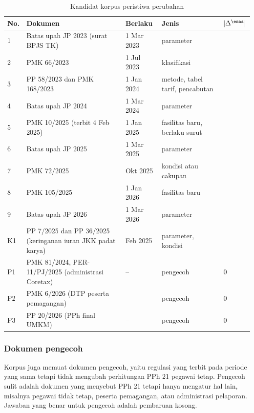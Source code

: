 \begin{table}[t]
\centering
\caption{Kandidat korpus peristiwa perubahan}
\label{tab:korpus}
\scriptsize
\begin{tabularx}{\columnwidth}{@{}P{0.35cm} L P{1.25cm} P{1.6cm} P{0.45cm}@{}}
\toprule
\textbf{No.} & \textbf{Dokumen} & \textbf{Berlaku} & \textbf{Jenis} & $|\Delta^{\emas}|$ \\
 & Batas upah JP 2023 (surat BPJS TK) & 1 Mar 2023 & parameter & \isian{} \\
2 & PMK 66/2023 & 1 Jul 2023 & klasifikasi & \isian{} \\
3 & PP 58/2023 dan PMK 168/2023 & 1 Jan 2024 & metode, tabel tarif, pencabutan & \isian{} \\
4 & Batas upah JP 2024 & 1 Mar 2024 & parameter & \isian{} \\
5 & PMK 10/2025 (terbit 4 Feb 2025) & 1 Jan 2025 & fasilitas baru, berlaku surut & \isian{} \\
6 & Batas upah JP 2025 & 1 Mar 2025 & parameter & \isian{} \\
7 & PMK 72/2025 & Okt 2025 & kondisi atau cakupan & \isian{} \\
8 & PMK 105/2025 & 1 Jan 2026 & fasilitas baru & \isian{} \\
9 & Batas upah JP 2026 & 1 Mar 2026 & parameter & \isian{} \\
\midrule
K1 & PP 7/2025 dan PP 36/2025 (keringanan iuran JKK padat karya) & Feb 2025 & parameter, kondisi & \isian{} \\
\midrule
P1 & PMK 81/2024, PER-11/PJ/2025 (administrasi Coretax) & -- & pengecoh & 0 \\
P2 & PMK 6/2026 (DTP peserta pemagangan) & -- & pengecoh & 0 \\
P3 & PP 20/2026 (PPh final UMKM) & -- & pengecoh & 0 \\
\bottomrule
\end{tabularx}
\end{table}


\subsubsection{Dokumen pengecoh}
Korpus juga memuat dokumen pengecoh, yaitu regulasi yang terbit pada periode yang sama tetapi tidak mengubah perhitungan PPh 21 pegawai tetap. Pengecoh sulit adalah dokumen yang menyebut PPh 21 tetapi hanya mengatur hal lain, misalnya pegawai tidak tetap, peserta pemagangan, atau administrasi pelaporan. Jawaban yang benar untuk pengecoh adalah pembaruan kosong.

